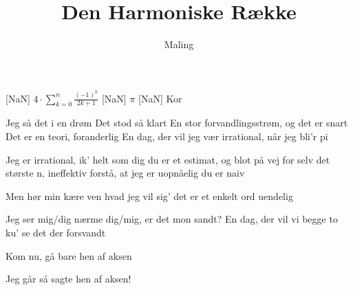 \documentclass[a4paper,11pt]{article}
\title{Den Harmoniske Række}
\author{Maling}
\begin{document}
\maketitle

\begin{roles}
[NaN] $4 \cdot \sum_{k=0}^n \frac{(-1)^k}{2k+1}$
[NaN] $\pi$
[NaN] Kor
\end{roles}

\begin{song}
 Jeg så det i en drøm
Det stod så klart
En stor forvandlingsstrøm, og det er snart
Det er en teori, foranderlig
En dag, der vil jeg vær irrational,
når jeg bli'r pi

 Jeg er irrational,
ik' helt som dig
du er et estimat,
og blot på vej
for selv det største n, ineffektiv
forstå, at jeg er uopnåelig
du er naiv

 Men hør min kære ven
hvad jeg vil sig'
det er et enkelt ord
uendelig

 Jeg ser mig/dig nærme dig/mig, er det mon sandt?
En dag, der vil vi begge to ku' se
det der forsvandt

 Kom nu, gå bare hen af aksen

 Jeg går så sagte hen af aksen!
\end{song}
\end{document}
